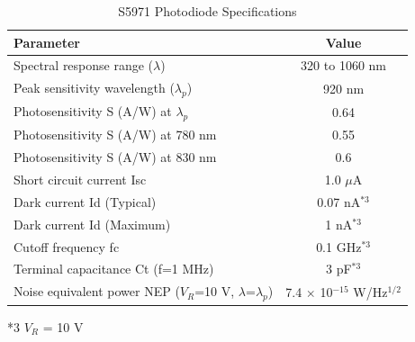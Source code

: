 \begin{table}[h]
  \centering
  \caption{S5971 Photodiode Specifications}
  \begin{tabular}{|l|c|}
  \hline
  \textbf{Parameter} & \textbf{Value} \\
  \hline
  Spectral response range ($\lambda$) & 320 to 1060 nm \\
  \hline
  Peak sensitivity wavelength ($\lambda_p$) & 920 nm \\
  \hline
  Photosensitivity S (A/W) at $\lambda_p$ & 0.64 \\
  \hline
  Photosensitivity S (A/W) at 780 nm & 0.55 \\
  \hline
  Photosensitivity S (A/W) at 830 nm & 0.6 \\
  \hline
  Short circuit current Isc & 1.0 $\mu$A \\
  \hline
  Dark current Id (Typical) & 0.07 nA$^{*3}$ \\
  \hline
  Dark current Id (Maximum) & 1 nA$^{*3}$ \\
  \hline
  Cutoff frequency fc & 0.1 GHz$^{*3}$ \\
  \hline
  Terminal capacitance Ct (f=1 MHz) & 3 pF$^{*3}$ \\
  \hline
  Noise equivalent power NEP ($V_R$=10 V, $\lambda$=$\lambda_p$) & 7.4 $\times$ 10$^{-15}$ W/Hz$^{1/2}$ \\
  \hline
  \end{tabular}
  \begin{tablenotes}
  \small
  \item[*3] $V_R$ = 10 V
  \end{tablenotes}
  \end{table}

